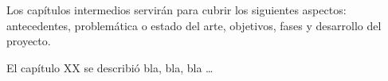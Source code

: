 Los capítulos intermedios servirán para cubrir los siguientes aspectos: antecedentes, problemática o estado del arte, objetivos, fases y desarrollo del proyecto.

\bigskip
El capítulo XX se describió bla, bla, bla …